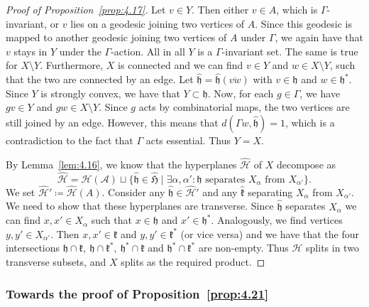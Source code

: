 \begin{proof}[Proof of Proposition~\ref{prop:4.17}]
  Let \(v \in Y\). Then either \(v \in A\), which is \(\Gamma\)-invariant, or \(v\) lies on a geodesic joining two vertices of \(A\). Since this geodesic is mapped to another geodesic joining two vertices of \(A\) under \(\Gamma\), we again have that \(v\) stays in \(Y\) under the \(\Gamma\)-action. All in all \(Y\) is a \(\Gamma\)-invariant set. The same is true for \(X \setminus Y\). Furthermore, \(X\) is connected and we can find \(v \in Y\) and \(w \in X \setminus Y\), such that the two are connected by an edge. Let \(\mathfrak{\hat h} = \mathfrak{\hat h}(\overline{vw})\) with \(v \in \mathfrak{h}\) and \(w \in \mathfrak{h}^\ast\). Since \(Y\) is strongly convex, we have that \(Y \subset \mathfrak{h}\). Now, for each \(g \in \Gamma\), we have \(gv \in Y\) and \(gw \in X \setminus Y\). Since \(g\) acts by combinatorial maps, the two vertices are still joined by an edge. However, this means that \(d(\Gamma w, \mathfrak{\hat h}) = 1\), which is a contradiction to the fact that \(\Gamma\) acts essential. Thus \(Y = X\).

  By Lemma~\ref{lem:4.16}, we know that the hyperplanes \(\mathcal{\hat H}\) of \(X\) decompose as
  \[
    \mathcal{\hat H} = \mathcal{\hat H(A)} \sqcup \{\mathfrak{\hat h} \in \mathfrak{\hat H} \mid \exists \alpha, \alpha'\colon \mathfrak{h} \text{ separates } X_\alpha  \text{ from } X_{\alpha'}\}.
  \]
  We set \(\mathcal{\hat H'} \coloneqq \mathcal{\hat H}(A)\). Consider any \(\mathfrak{\hat h} \in \mathcal{\hat H'}\) and any \(\mathfrak{\hat k}\) separating \(X_\alpha\) from \(X_{\alpha'}\). We need to show that these hyperplanes are transverse. Since \(\mathfrak{\hat h}\) separates \(X_\alpha\) we can find \(x, x' \in X_\alpha\) such that \(x \in \mathfrak{h}\) and \(x' \in \mathfrak{h}^\ast\). Analogously, we find vertices \(y,y' \in X_{\alpha'}\). Then \(x,x' \in \mathfrak{k}\) and \(y,y' \in \mathfrak{k}^\ast\) (or vice versa) and we have that the four intersections \(\mathfrak{h} \cap \mathfrak{k},\ \mathfrak{h} \cap \mathfrak{k}^\ast,\ \mathfrak{h}^\ast \cap \mathfrak{k}\) and \(\mathfrak{h}^\ast \cap \mathfrak{k}^\ast\) are non-empty. Thus \(\mathcal{H}\) splits in two transverse subsets, and \(X\) splits as the required product.
\end{proof}

\subsubsection*{Towards the proof of Proposition~\ref{prop:4.21}}

